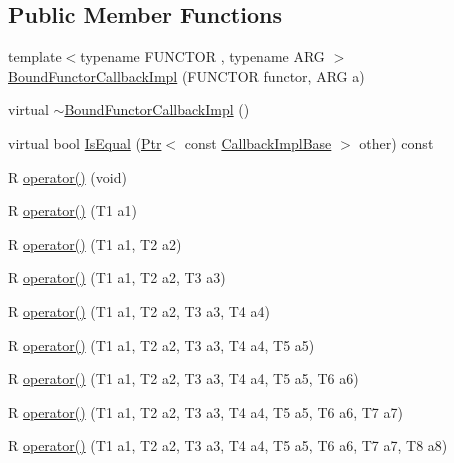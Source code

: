 \subsection*{Public Member Functions}
\begin{DoxyCompactItemize}
\item 
{\footnotesize template$<$typename F\+U\+N\+C\+T\+OR , typename A\+RG $>$ }\\\hyperlink{classns3_1_1BoundFunctorCallbackImpl_ac9ef80fe2af407822e4b6db77c5e91d8}{Bound\+Functor\+Callback\+Impl} (F\+U\+N\+C\+T\+OR functor, A\+RG a)
\item 
virtual \hyperlink{classns3_1_1BoundFunctorCallbackImpl_a2c1c76072cd8bb5e9cc733aeaac00dfb}{$\sim$\+Bound\+Functor\+Callback\+Impl} ()
\item 
virtual bool \hyperlink{classns3_1_1BoundFunctorCallbackImpl_a1e4a55edc1cc443c8271f4cd328303a5}{Is\+Equal} (\hyperlink{classns3_1_1Ptr}{Ptr}$<$ const \hyperlink{classns3_1_1CallbackImplBase}{Callback\+Impl\+Base} $>$ other) const 
\end{DoxyCompactItemize}
{\bf }\par
\begin{DoxyCompactItemize}
\item 
R \hyperlink{classns3_1_1BoundFunctorCallbackImpl_a520ef6b50d50d75c193e8d07d1636419}{operator()} (void)
\item 
R \hyperlink{classns3_1_1BoundFunctorCallbackImpl_a4431e6e0021f5a0ba002f4f36001f987}{operator()} (T1 a1)
\item 
R \hyperlink{classns3_1_1BoundFunctorCallbackImpl_a1029b0d597e83eeb4c55072dd81c2bd1}{operator()} (T1 a1, T2 a2)
\item 
R \hyperlink{classns3_1_1BoundFunctorCallbackImpl_a74e7277382c9576b78a6c19e782be980}{operator()} (T1 a1, T2 a2, T3 a3)
\item 
R \hyperlink{classns3_1_1BoundFunctorCallbackImpl_a1cf84a2e2c74a61ae1fd9d0a8249cac4}{operator()} (T1 a1, T2 a2, T3 a3, T4 a4)
\item 
R \hyperlink{classns3_1_1BoundFunctorCallbackImpl_a7847df5c14b1f625ea85455a2d8e7261}{operator()} (T1 a1, T2 a2, T3 a3, T4 a4, T5 a5)
\item 
R \hyperlink{classns3_1_1BoundFunctorCallbackImpl_a1dd80c74ce0489efd1daf121377eff15}{operator()} (T1 a1, T2 a2, T3 a3, T4 a4, T5 a5, T6 a6)
\item 
R \hyperlink{classns3_1_1BoundFunctorCallbackImpl_a319d0c5aed33020b9409760b0a896b12}{operator()} (T1 a1, T2 a2, T3 a3, T4 a4, T5 a5, T6 a6, T7 a7)
\item 
R \hyperlink{classns3_1_1BoundFunctorCallbackImpl_a4dffac217954b068dbc4662c186d75ec}{operator()} (T1 a1, T2 a2, T3 a3, T4 a4, T5 a5, T6 a6, T7 a7, T8 a8)
\end{DoxyCompactItemize}

